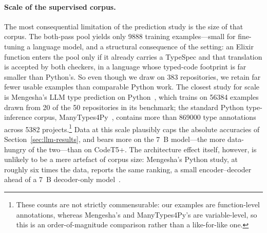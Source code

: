 \paragraph{Scale of the supervised corpus.}
The most consequential limitation of the prediction study is the size of that corpus.
The both-pass pool yields only \num{9888} training examples---small for fine-tuning a language model, and a structural consequence of the setting: an Elixir function enters the pool only if it already carries a TypeSpec and that translation is accepted by both checkers, in a language whose typed-code footprint is far smaller than Python's.
So even though we draw on 383 repositories, we retain far fewer usable examples than comparable Python work.
The closest study for scale is Mengesha's LLM type prediction on Python~\cite{Nina}, which trains on \num{56384} examples drawn from 20 of the 50 repositories in its benchmark; the standard Python type-inference corpus, ManyTypes4Py~\cite{manytypes4py}, contains more than \num{869000} type annotations across \num{5382} projects.\footnote{These counts are not strictly commensurable: our examples are function-level annotations, whereas Mengesha's and ManyTypes4Py's are variable-level, so this is an order-of-magnitude comparison rather than a like-for-like one.}
Data at this scale plausibly caps the absolute accuracies of Section~\ref{sec:llm-results}, and bears more on the 7~B model---the more data-hungry of the two---than on CodeT5+.
The architecture effect itself, however, is unlikely to be a mere artefact of corpus size: Mengesha's Python study, at roughly six times the data, reports the same ranking, a small encoder--decoder ahead of a 7~B decoder-only model~\cite{Nina}.

